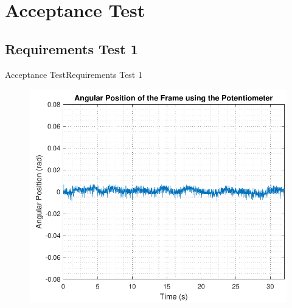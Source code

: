 \section{Acceptance Test}

\subsection{Requirements Test 1}

\begin{frame}{Acceptance Test}{Requirements Test 1}
%
\begin{minipage}{\linewidth}
	\begin{minipage}{0.45\linewidth}
		\begin{figure}[H]
			\centering
			\includegraphics[scale=.345]{Pictures/testReq1}
		\end{figure}
	\end{minipage}
	\hspace{0.03\linewidth}
	\begin{minipage}{0.45\linewidth}
		\begin{figure}[H]\vspace{0mm}
			\centering

\end{figure}
\end{minipage}
\end{minipage}
\end{frame}
